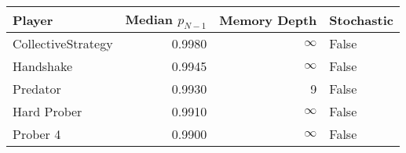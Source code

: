 \begin{tabular}{lrrl}
\toprule
             Player &  Median $p_{N-1}$ &  Memory Depth & Stochastic \\
\midrule
 CollectiveStrategy &            0.9980 &            \(\infty\) &      False \\
          Handshake &            0.9945 &            \(\infty\) &      False \\
           Predator &            0.9930 &             9 &      False \\
        Hard Prober &            0.9910 &            \(\infty\) &      False \\
           Prober 4 &            0.9900 &            \(\infty\) &      False \\
\bottomrule
\end{tabular}
